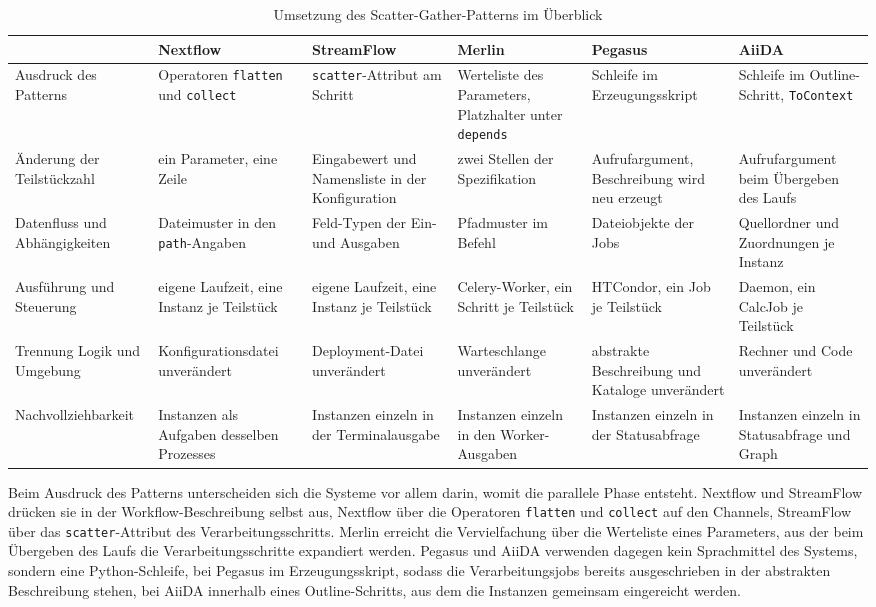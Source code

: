 \begin{table}[H]
  \caption{Umsetzung des Scatter-Gather-Patterns im Überblick}
  \label{tab:sg:vergleich}
  \centering
  \scriptsize
  \setlength{\tabcolsep}{3pt}
  \renewcommand{\arraystretch}{1.4}
  \begin{tabular}{>{\raggedright\arraybackslash}p{2.7cm} >{\raggedright\arraybackslash}p{1.9cm} >{\raggedright\arraybackslash}p{1.9cm} >{\raggedright\arraybackslash}p{1.9cm} >{\raggedright\arraybackslash}p{1.9cm} >{\raggedright\arraybackslash}p{1.9cm}}
    \hline
     & \textbf{Nextflow} & \textbf{Stream\-Flow} & \textbf{Merlin} & \textbf{Pegasus} & \textbf{AiiDA} \\
    \hline
    Ausdruck des Patterns & Operatoren \texttt{flatten} und \texttt{collect} & \texttt{scatter}-Attribut am Schritt & Werteliste des Parameters, Platzhalter unter \texttt{depends} & Schleife im Erzeugungs\-skript & Schleife im Outline-Schritt, \texttt{ToContext} \\
    Änderung der Teilstückzahl & ein Parameter, eine Zeile & Eingabewert und Namensliste in der Konfiguration & zwei Stellen der Spezifikation & Aufruf\-argument, Beschreibung wird neu erzeugt & Aufruf\-argument beim Übergeben des Laufs \\
    Datenfluss und Abhängigkeiten & Dateimuster in den \texttt{path}-Angaben & Feld-Typen der Ein- und Ausgaben & Pfadmuster im Befehl & Datei\-objekte der Jobs & Quellordner und Zuordnungen je Instanz \\
    Ausführung und Steuerung & eigene Laufzeit, eine Instanz je Teilstück & eigene Laufzeit, eine Instanz je Teilstück & Celery-Worker, ein Schritt je Teilstück & HTCondor, ein Job je Teilstück & Daemon, ein CalcJob je Teilstück \\
    Trennung Logik und Umgebung & Konfigurations\-datei unverändert & Deployment-Datei unverändert & Warteschlange unverändert & abstrakte Beschreibung und Kataloge unverändert & Rechner und Code unverändert \\
    Nachvollziehbarkeit & Instanzen als Aufgaben desselben Prozesses & Instanzen einzeln in der Terminal\-ausgabe & Instanzen einzeln in den Worker-Ausgaben & Instanzen einzeln in der Status\-abfrage & Instanzen einzeln in Status\-abfrage und Graph \\
    \hline
  \end{tabular}
\end{table}

Beim Ausdruck des Patterns unterscheiden sich die Systeme vor allem
darin, womit die parallele Phase entsteht. Nextflow und
StreamFlow drücken sie in der Workflow-Beschreibung selbst aus,
Nextflow über die Operatoren \texttt{flatten} und \texttt{collect}
auf den Channels, StreamFlow über das \texttt{scatter}-Attribut des
Verarbeitungsschritts. Merlin erreicht die Vervielfachung über die
Werteliste eines Parameters, aus der beim Übergeben des Laufs die
Verarbeitungsschritte expandiert werden. Pegasus und AiiDA verwenden
dagegen kein Sprachmittel des Systems, sondern eine Python-Schleife,
bei Pegasus im Erzeugungsskript, sodass die Verarbeitungsjobs
bereits ausgeschrieben in der abstrakten Beschreibung stehen, bei AiiDA innerhalb eines Outline-Schritts, aus dem die Instanzen
gemeinsam eingereicht werden.

